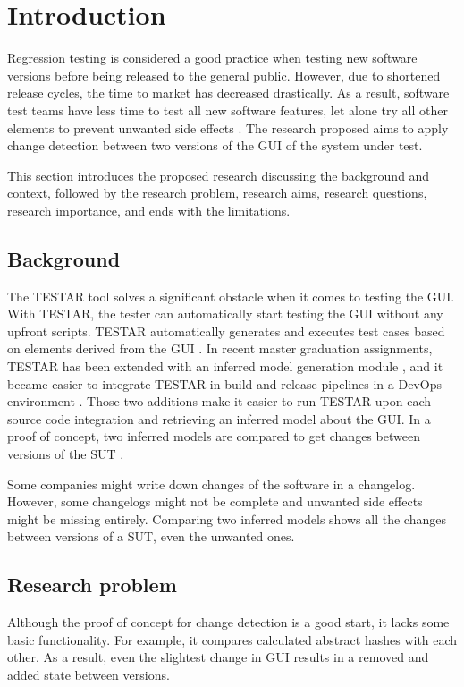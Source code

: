 \section{Introduction} \label{intoduction}

Regression testing is considered a good practice when testing new software versions before being released to the general public. 
However, due to shortened release cycles, the time to market has decreased drastically. As a result, software test teams have less time to test all new software features, let alone try all other elements to prevent unwanted side effects \cite{rapid-release-cycle-issues}.
The research proposed aims to apply change detection between two versions of the GUI of the system under test. 

This section introduces the proposed research discussing the background and context, followed by the research problem, research aims, research questions, research importance, and ends with the limitations. 

\subsection{Background}
The TESTAR tool solves a significant obstacle when it comes to testing the GUI. With TESTAR, the tester can automatically start testing the GUI without any upfront scripts. TESTAR automatically generates and executes test cases based on elements derived from the GUI \cite{VosAho2021}. In recent master graduation assignments, TESTAR has been extended with an inferred model generation module \cite{thesisMulders}, and it became easier to integrate TESTAR in build and release pipelines in a DevOps environment \cite{thesisSlomp}. Those two additions make it easier to run TESTAR upon each source code integration and retrieving an inferred model about the GUI. In a proof of concept, two inferred models are compared to get changes between versions of the SUT \cite{stateDiff}.

Some companies might write down changes of the software in a changelog. However, some changelogs might not be complete and unwanted side effects might be missing entirely. Comparing two inferred models shows all the changes between versions of a SUT, even the unwanted ones.

\subsection{Research problem}
Although the proof of concept for change detection is a good start, it lacks some basic functionality. For example, it compares calculated abstract hashes with each other. As a result, even the slightest change in GUI results in a removed and added state between versions.


